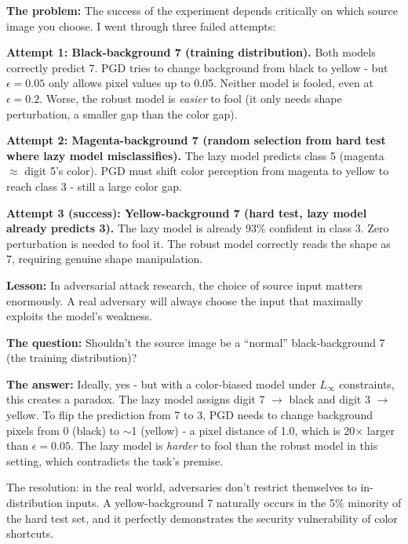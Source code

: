 \documentclass[9pt,a4paper,twocolumn,twoside]{tau-class/tau}
\begin{document}
        \begin{tauenv}[frametitle={Challenge: Source Image Selection - Three Iterations}]
            \textbf{The problem:} The success of the experiment depends critically on which source image you choose. I went through three failed attempts:

            \textbf{Attempt 1: Black-background 7 (training distribution).} Both models correctly predict 7. PGD tries to change background from black to yellow - but $\epsilon = 0.05$ only allows pixel values up to 0.05. Neither model is fooled, even at $\epsilon = 0.2$. Worse, the robust model is \textit{easier} to fool (it only needs shape perturbation, a smaller gap than the color gap).

            \textbf{Attempt 2: Magenta-background 7 (random selection from hard test where lazy model misclassifies).} The lazy model predicts class 5 (magenta $\approx$ digit 5's color). PGD must shift color perception from magenta to yellow to reach class 3 - still a large color gap.

            \textbf{Attempt 3 (success): Yellow-background 7 (hard test, lazy model already predicts 3).} The lazy model is already 93\% confident in class 3. Zero perturbation is needed to fool it. The robust model correctly reads the shape as 7, requiring genuine shape manipulation.

            \textbf{Lesson:} In adversarial attack research, the choice of source input matters enormously. A real adversary will always choose the input that maximally exploits the model's weakness.
        \end{tauenv}

        \begin{tauenv}[frametitle={Challenge: The Black-Background Paradox}]
            \textbf{The question:} Shouldn't the source image be a ``normal'' black-background 7 (the training distribution)?

            \textbf{The answer:} Ideally, yes - but with a color-biased model under $L_\infty$ constraints, this creates a paradox. The lazy model assigns digit 7 $\rightarrow$ black and digit 3 $\rightarrow$ yellow. To flip the prediction from 7 to 3, PGD needs to change background pixels from 0 (black) to $\sim$1 (yellow) - a pixel distance of 1.0, which is 20$\times$ larger than $\epsilon = 0.05$. The lazy model is \textit{harder} to fool than the robust model in this setting, which contradicts the task's premise.

            The resolution: in the real world, adversaries don't restrict themselves to in-distribution inputs. A yellow-background 7 naturally occurs in the 5\% minority of the hard test set, and it perfectly demonstrates the security vulnerability of color shortcuts.
        \end{tauenv}
\end{document}
